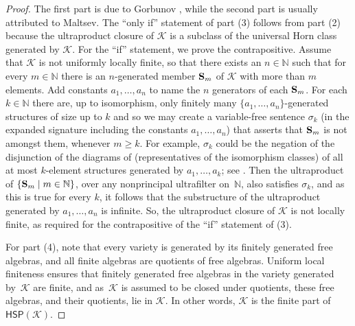 \documentclass[10pt,a4paper]{amsart}
\theoremstyle{plain}
\theoremstyle{definition}
\begin{document}
\begin{proof}
The first part is due to Gorbunov \cite[Proposition 2.5.12]{gor}, while the second part is usually attributed to Maltsev.  
The ``only if'' statement of part (3) follows from part (2) because the ultraproduct closure of $\mathscr{K}$ is a subclass of the universal Horn class generated by $\mathscr{K}$.
For the ``if'' statement, we prove the contrapositive.  
Assume that $\mathscr{K}$ is not uniformly locally finite, so that there exists an $n\in\mathbb{N}$ such that for every $m\in\mathbb{N}$ there is an $n$-generated member ${\bf S}_m$ of $\mathscr{K}$ with more than $m$ elements.
Add constants $a_1,\dots,a_n$ to name the $n$ generators of each ${\bf S}_m$.  
For each $k\in\mathbb{N}$ there are, up to isomorphism, only finitely many $\{a_1,\dots,a_n\}$-generated structures of size up to $k$ and so we may create a variable-free sentence $\sigma_k$ (in the expanded signature including the constants $a_1,\dots,a_n$) that asserts that ${\bf S}_m$ is not amongst them, whenever $m\geq k$.
For example, $\sigma_k$ could be the negation of the disjunction of the diagrams of (representatives of the isomorphism classes) of all at most $k$-element structures generated by $a_1,\dots,a_k$; see \cite[Definition~8.35]{ALV}.
Then the ultraproduct of $\{{\bf S}_m\mid m\in \mathbb{N}\}$, over any nonprincipal ultrafilter on~$\mathbb{N}$, also satisfies $\sigma_k$, and as this is true for every $k$, it follows that the substructure of the ultraproduct generated by $a_1,\dots,a_n$ is infinite.
So, the ultraproduct closure of $\mathscr{K}$ is not locally finite, as required for the contrapositive of the ``if'' statement of (3).

For part (4), note that every variety is generated by its finitely generated free algebras, and all finite algebras are quotients of free algebras.  Uniform local finiteness ensures that finitely generated free algebras in the variety generated by~$\mathscr{K}$ are finite, and as~$\mathscr{K}$ is assumed to be closed under quotients, these free algebras, and their quotients, lie in $\mathscr{K}$.  In other words, $\mathscr{K}$ is the finite part of $\mathsf{HSP}(\mathscr{K})$.
\end{proof}
\end{document}
